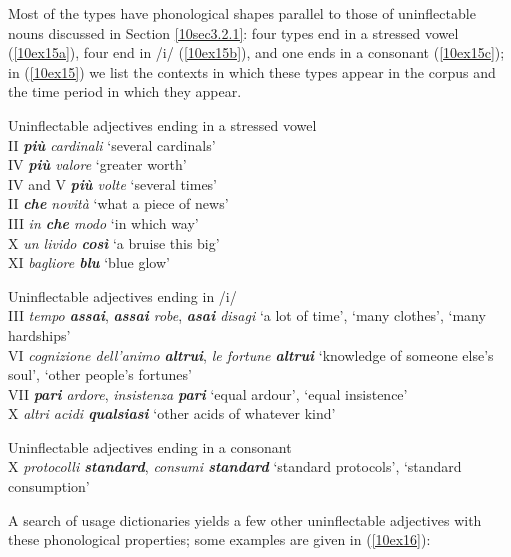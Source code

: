 \documentclass[output=paper,colorlinks,citecolor=brown]{langscibook}
\begin{document}
\largerpage[1.5]

Most of the types have phonological shapes parallel to those of uninflectable nouns discussed in Section \ref{10sec3.2.1}: four types end in a stressed vowel (\ref{10ex15a}), four end in /i/ (\ref{10ex15b}), and one ends in a consonant (\ref{10ex15c}); in (\ref{10ex15}) we list the contexts in which these types appear in the corpus and the time period in which they appear.

\begin{exe}
	\ex \label{10ex15}
	\begin{xlist}
		\ex \label{10ex15a} Uninflectable adjectives ending in a stressed vowel \\
		II \emph{\textbf{più} cardinali} ‘several cardinals’ \\
		IV \emph{\textbf{più} valore} ‘greater worth’ \\
		IV and V \emph{\textbf{più} volte} ‘several times’ \\
		II \emph{\textbf{che} novità} ‘what a piece of news’ \\
		III \emph{in \textbf{che} modo} ‘in which way’ \\
		X \emph{un livido \textbf{così}} ‘a bruise this big’ \\
		XI \emph{bagliore \textbf{blu}} ‘blue glow’

		\ex \label{10ex15b} Uninflectable adjectives ending in /i/ \\
		III \emph{tempo \textbf{assai}}, \emph{\textbf{assai} robe}, \emph{\textbf{asai} disagi} ‘a lot of time’, ‘many clothes’, ‘many hardships’ \\
		VI \emph{cognizione dell’animo \textbf{altrui}}, \emph{le fortune \textbf{altrui}} ‘knowledge of someone else’s soul’, ‘other people’s fortunes’ \\
		VII \emph{\textbf{pari} ardore}, \emph{insistenza \textbf{pari}} ‘equal ardour’, ‘equal insistence’ \\
		X \emph{altri acidi \textbf{qualsiasi}} ‘other acids of whatever kind’
		
		\ex \label{10ex15c} Uninflectable adjectives ending in a consonant \\
		X \emph{protocolli \textbf{standard}}, \emph{consumi \textbf{standard}} ‘standard protocols’, ‘standard consumption’
	\end{xlist}
\end{exe}

A search of usage dictionaries yields a few other uninflectable adjectives with these phonological properties; some examples are given in (\ref{10ex16}):
\end{document}
